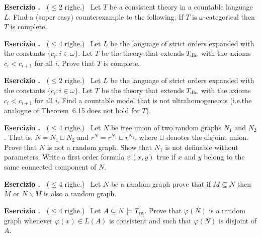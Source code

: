 \documentclass[10pt]{article}
\def\phi{\varphi}
\def\sm{\smallsetminus}
\newcounter{ex}
\newenvironment{exercise}{\bigskip\addtocounter{ex}{1}\textbf{Esercizio \theex.\ }}{}
\begin{document}
\begin{exercise}
  ($\le 2$ righe.) \ 
  Let $T$ be a consistent theory in a countable language $L$.
  Find a (super easy) counterexample to the following. 
  If $T$ is $\omega$-categorical then $T$ is complete.
\end{exercise}


\begin{exercise}
  ($\le 4$ righe.) \ 
  Let $L$ be the language of strict orders expanded with the constants $\big\{c_i: i\in\omega\big\}$.
  Let $T$ be the theory that extends $T_{\rm dlo}$ with the axioms $c_i<c_{i+1}$ for all $i$.
  Prove that $T$ is complete.
\end{exercise}


\begin{exercise}
  ($\le 2$ righe.) \ 
  Let $L$ be the language of strict orders expanded with the constants $\big\{c_i: i\in\omega\big\}$.                                 
  Let $T$ be the theory that extends $T_{\rm dlo}$ with the axioms $c_i<c_{i+1}$ for all $i$.
  Find a countable model that is not ultrahomogeneous (i.e.\@ the analogue of Theorem~6.15 does not hold for $T$).
\end{exercise}

\begin{exercise}
  ($\le 4$ righe.) \ 
  Let $N$ be free union of two random graphs $N_1$ and $N_2$.
  That is, $N=N_1\sqcup N_2$ and $r^N= r^{N_1}\sqcup r^{N_2}$, where  $\sqcup$ denotes the disjoint union.
  Prove that $N$ is not a random graph.
  Show that $N_1$ is not definable without parameters.
  Write a first order formula $\psi(x,y)$ true if $x$ and $y$ belong to the same connected component of $N$.
\end{exercise}

\begin{exercise}
  ($\le 4$ righe.) \ 
  Let $N$ be a random graph prove that if $M\subseteq N$ then $M$ or $N\sm M$ is also a random graph.
\end{exercise}

\begin{exercise}
  ($\le 4$ righe.) \ 
  Let $A\subseteq N\models T_{\rm rg}$.
  Prove that $\phi(N)$ is a random graph whenever $\phi(x)\in L(A)$ is consistent and such that $\phi(N)$ is disjoint of $A$.
\end{exercise}
\end{document}
